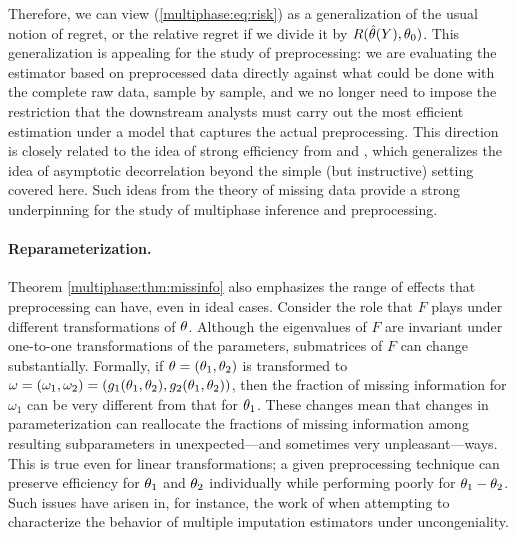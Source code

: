 Therefore, we can view (\ref{multiphase:eq:risk}) as a generalization of the usual notion of regret, or the relative regret if we divide it by $R(\hat{\theta}(Y), \theta_0)$. This generalization is appealing for the study of preprocessing: we are evaluating the estimator based on preprocessed data directly against what could be done with the complete raw data, sample by sample, and we no longer need to impose the restriction that the downstream analysts must carry out the most efficient estimation under a model that captures the actual preprocessing. This direction is closely related to the idea of strong efficiency from \cite{Xie2012} and \cite{Meng2012}, which generalizes the idea of asymptotic decorrelation beyond the simple (but instructive) setting covered here.
Such ideas from the theory of missing data provide a strong underpinning for the study of multiphase inference and preprocessing.

\paragraph{Reparameterization.}
Theorem \ref{multiphase:thm:missinfo} also emphasizes the range of effects that preprocessing can have, even in ideal cases.
Consider the role that $F$ plays under different transformations of $\theta$.
Although the eigenvalues of $F$ are invariant under one-to-one transformations of the parameters, submatrices of $F$ can change substantially.
Formally, if $\theta = (\theta_1, \theta_2)$ is transformed to $\omega = (\omega_1, \omega_2) = (g_1(\theta_1, \theta_2), g_2(\theta_1, \theta_2))$, then the fraction of missing information for $\omega_1$ can be very different from that for $\theta_1$.
These changes mean that changes in parameterization can reallocate the fractions of missing information among resulting subparameters in unexpected---and sometimes very unpleasant---ways.
This is true even for linear transformations; a given preprocessing technique can preserve efficiency for $\theta_1$ and $\theta_2$ individually while performing poorly for $\theta_1 - \theta_2$.
Such issues have arisen in, for instance, the work of \cite{Xie2012} when attempting to characterize the behavior of multiple imputation estimators under uncongeniality.

